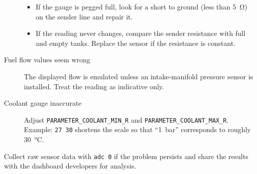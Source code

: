\begin{description}
\begin{itemize}
        \item If the gauge is pegged full, look for a short to ground (less than \SI{5}{\ohm}) on the sender line and repair it.
        \item If the reading never changes, compare the sender resistance with full and empty tanks. Replace the sensor if the resistance is constant.
    \end{itemize}
    \item[Fuel flow values seem wrong] The displayed flow is emulated unless an intake-manifold pressure sensor is installed. Treat the reading as indicative only.
    \item[Coolant gauge inaccurate] Adjust \texttt{PARAMETER\_COOLANT\_MIN\_R} and \texttt{PARAMETER\_COOLANT\_MAX\_R}. Example: \verb|27 30| shortens the scale so that ``1~bar'' corresponds to roughly \SI{30}{\celsius}.
\end{description}

Collect raw sensor data with \verb|adc 0| if the problem persists and share the results with the dashboard developers for analysis.
